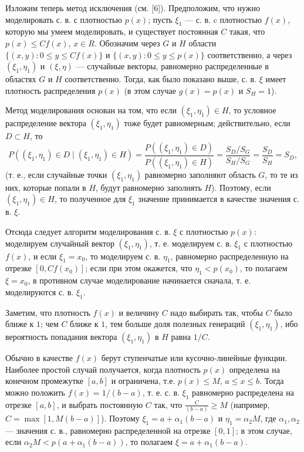 \documentclass[bachelor, och, pract3]{SCWorks}
\begin{document}
Изложим теперь метод исключения (см. [6]). Предположим, что нужно моделировать с. в. с плотностью \(p(x)\); пусть \(\xi_1\) --- с. в. c плотностью \(f(x)\), которую мы умеем моделировать, и существует постоянная \(C\) такая, что \\ \(p(x) \le C f(x)\), \(x \in R\). Обозначим через \(G\) и \(H\) области \(\{(x, y) : 0 \le y \le C f(x)\}\) и \(\{(x, y) : 0 \le y \le p(x)\}\) соответственно, а через \((\xi_1, \eta_1)\) и \((\xi, \eta)\) --- случайные векторы, равномерно распределенные в областях \(G\) и \(H\) соответственно. Тогда, как было показано выше, с. в. \(\xi\) имеет плотность распределения \(p(x)\) (в этом случае \(g(x) = p(x)\) и \(S_H = 1\)).

Метод моделирования основан на том, что если \((\xi_1, \eta_1) \in H\), то условное распределение вектора \((\xi_1, \eta_1)\) тоже будет равномерным; действительно, если $D \subset H$, то
\[
P((\xi_1, \eta_1) \in D \mid (\xi_1, \eta_1) \in H) = \frac{P((\xi_1, \eta_1) \in D)}{P((\xi_1, \eta_1) \in H)} = \frac{S_D / S_G}{S_H / S_G} = \frac{S_D}{S_H} = S_D,
\]
(т. е., если случайные точки \((\xi_1, \eta_1)\) равномерно заполняют область \(G\), то те из них, которые попали в \(H\), будут равномерно заполнять \(H\)). Поэтому, если \((\xi_1, \eta_1) \in H\), то полученное для \(\xi_1\) значение принимается в качестве значения с. в. \(\xi\).

Отсюда следует алгоритм моделирования с. в. $\xi$ с плотностью \(p(x)\): моделируем случайный вектор \((\xi_1, \eta_1)\), т. е. моделируем с. в. \(\xi_1\) с плотностью \(f(x)\), и если \(\xi_1 = x_0\), то моделируем с. в. \(\eta_1\), равномерно распределенную на отрезке \([0, C f(x_0)]\); если при этом окажется, что \(\eta_1 < p(x_0)\), то полагаем \(\xi = x_0\), в противном случае моделирование начинается сначала, т. е. моделируются с. в. \(\xi_1\).

Заметим, что плотность \(f(x)\) и величину \(C\) надо выбирать так, чтобы \(C\) было ближе к \(1\); чем \(C\) ближе к \(1\), тем больше доля полезных генераций \((\xi_1, \eta_1)\), ибо вероятность попадания вектора \((\xi_1, \eta_1)\) в \(H\) равна \(1/C\).

Обычно в качестве \(f(x)\) берут ступенчатые или кусочно-линейные функции. Наиболее простой случай получается, когда плотность $p(x)$ определена на конечном промежутке $[a,b]$ и ограничена, т.е. $p(x) \leq M$, $a \leq x \leq b$. Тогда можно положить \(f(x) = 1 / (b-a)\), т. е. с. в. \(\xi_1\) равномерно распределена на отрезке \([a, b]\), и выбрать постоянную $C$ так, что $\displaystyle\frac{C}{(b-a)} \geq M$ (например, $C = \max [1, M(b-a)]$). Поэтому \(\xi_1 = a + \alpha_1(b-a)\) и \(\eta_1 = \alpha_2 M\), где \(\alpha_1, \alpha_2\) --- значения с. в., равномерно распределенной на отрезке \([0, 1]\); в этом случае, если \(\alpha_2 M < p(a + \alpha_1(b-a))\), то полагаем \(\xi = a + \alpha_1(b-a)\).
\end{document}
